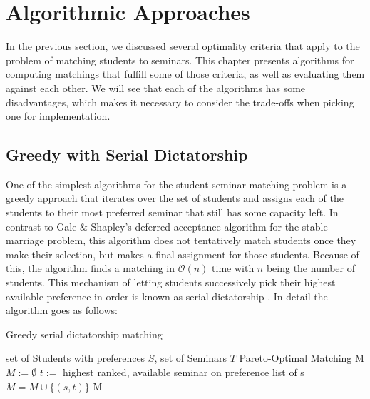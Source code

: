 \section{Algorithmic Approaches}\label{chapter:algorithms}
In the previous section, we discussed several optimality criteria that apply to the problem of matching students to seminars. This chapter presents algorithms for computing matchings that fulfill some of those criteria, as well as evaluating them against each other. We will see that each of the algorithms has some disadvantages, which makes it necessary to consider the trade-offs when picking one for implementation.

\subsection{Greedy with Serial Dictatorship}\label{algo-rsd}
One of the simplest algorithms for the student-seminar matching problem is a greedy approach that iterates over the set of students and assigns each of the students to their most preferred seminar that still has some capacity left. In contrast to Gale \& Shapley's deferred acceptance algorithm for the stable marriage problem, this algorithm does not tentatively match students once they make their selection, but makes a final assignment for those students. Because of this, the algorithm finds a matching in $\mathcal{O}(n)$ time with $n$ being the number of students. This mechanism of letting students successively pick their highest available preference in order is known as serial dictatorship \cite{MANEA2007316}. In detail the algorithm goes as follows: 

\begin{algorithm} %
    \caption{Greedy serial dictatorship matching} 
    \label{alg1} %
    \begin{algorithmic} %
        \Require set of Students with preferences $S$, set of Seminars $T$
        \Ensure Pareto-Optimal Matching M
        \State $M := \emptyset$
            \State $t :=$ highest ranked, available seminar on preference list of s
                \State $M = M \cup \{(s, t)\}$
            \EndIf
        \EndFor
        \State\Return M
        \EndFunction
    \end{algorithmic}
\end{algorithm}

